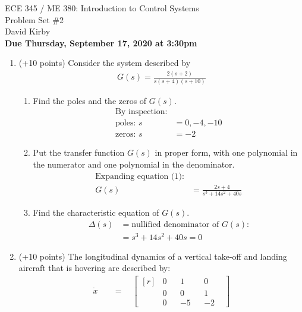 \documentclass[11pt]{article}
\begin{document}
 	\begin{center}
 	\LARGE{ECE 345 / ME 380: Introduction to Control Systems\\Problem Set \#2}\\[1.5em]
 	\large David Kirby\\[1.5em]
 	\large \textbf{Due Thursday, September 17, 2020 at 3:30pm}\\[2.5em]
 	\end{center}

\begin{enumerate}
    \item (+10 points) Consider the system described by
    \begin{align}
        G(s)=\frac{2(s+2)}{s(s+ 4)(s+ 10)}
    \end{align}
    \begin{enumerate}
        \item Find the poles and the zeros of \(G(s)\).
        \begin{align*}
            \text{By inspection:}&\\
            \text{poles: }s&=0,-4,-10\\
            \text{zeros: }s&=-2
        \end{align*}
        \item Put the transfer function \(G(s)\) in proper form, with one polynomial in the numerator and one polynomial in the denominator.
        \begin{align*}
            \text{Expanding equation (1):}&\\
            G(s)&=\frac{2s+4}{s^3+14s^2+40s}
        \end{align*}
        \item Find the characteristic equation of \(G(s)\).
        \begin{align*}
            \Delta(s)&=\text{nullified denominator of }G(s)\text{:}\\
            &=s^3+14s^2+40s=0
        \end{align*}
    \end{enumerate}
    \item (+10 points) The longitudinal dynamics of a vertical take-off and landing aircraft that is hovering are described by:
    \begin{align}
        \dot{x}\quad&=\quad
            \begin{bmatrix*}[r]
            &0 &&1 &&0&\\
            &0 &&0 &&1&\\
            &0 &&-5 &&-2&

\end{bmatrix*}
\end{align}
\end{enumerate}
\end{document}
